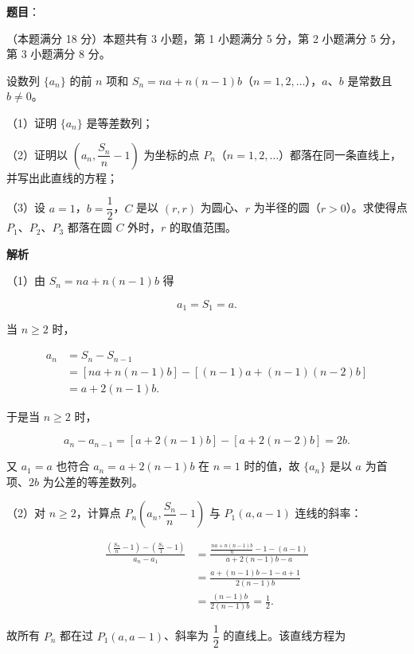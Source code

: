 \begin{answer}

\textbf{题目}：

（本题满分 18 分）本题共有 3 小题，第 1 小题满分 5 分，第 2 小题满分 5 分，第 3 小题满分 8 分。

设数列 $\{a_n\}$ 的前 $n$ 项和 $S_n=na+n(n-1)b$（$n=1,2,\ldots$），$a$、$b$ 是常数且 $b\ne 0$。

（1）证明 $\{a_n\}$ 是等差数列；

（2）证明以 $\left(a_n,\dfrac{S_n}{n}-1\right)$ 为坐标的点 $P_n$（$n=1,2,\ldots$）都落在同一条直线上，并写出此直线的方程；

（3）设 $a=1$，$b=\dfrac12$，$C$ 是以 $(r,r)$ 为圆心、$r$ 为半径的圆（$r>0$）。求使得点 $P_1$、$P_2$、$P_3$ 都落在圆 $C$ 外时，$r$ 的取值范围。

\textbf{解析}

（1）由 $S_n=na+n(n-1)b$ 得

\nopagebreak[4]
\[
a_1=S_1=a.
\]

当 $n\ge2$ 时，

\nopagebreak[4]
\[
\begin{aligned}
a_n&=S_n-S_{n-1}\\
&=\left[na+n(n-1)b\right]
-\left[(n-1)a+(n-1)(n-2)b\right]\\
&=a+2(n-1)b.
\end{aligned}
\]

于是当 $n\ge2$ 时，

\nopagebreak[4]
\[
a_n-a_{n-1}
=\left[a+2(n-1)b\right]-\left[a+2(n-2)b\right]
=2b.
\]

又 $a_1=a$ 也符合 $a_n=a+2(n-1)b$ 在 $n=1$ 时的值，故 $\{a_n\}$ 是以 $a$ 为首项、$2b$ 为公差的等差数列。

（2）对 $n\ge2$，计算点 $P_n\left(a_n,\dfrac{S_n}{n}-1\right)$ 与 $P_1(a,a-1)$ 连线的斜率：

\nopagebreak[4]
\[
\begin{aligned}
\frac{\left(\frac{S_n}{n}-1\right)-\left(\frac{S_1}{1}-1\right)}{a_n-a_1}
&=\frac{\frac{na+n(n-1)b}{n}-1-(a-1)}
{a+2(n-1)b-a}\\
&=\frac{a+(n-1)b-1-a+1}{2(n-1)b}\\
&=\frac{(n-1)b}{2(n-1)b}=\frac12.
\end{aligned}
\]

故所有 $P_n$ 都在过 $P_1(a,a-1)$、斜率为 $\dfrac12$ 的直线上。该直线方程为


\end{answer}

